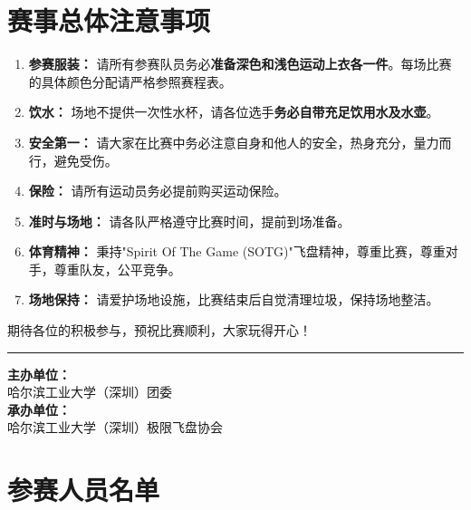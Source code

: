 \documentclass{ctexart}
\begin{document}
\section{赛事总体注意事项}
\begin{enumerate}[label=\arabic*., itemsep=0.5em]
    \item \textbf{参赛服装：} 请所有参赛队员务必\textbf{准备深色和浅色运动上衣各一件}。每场比赛的具体颜色分配请严格参照赛程表。
    \item \textbf{饮水：} 场地不提供一次性水杯，请各位选手\textbf{务必自带充足饮用水及水壶}。
    \item \textbf{安全第一：} 请大家在比赛中务必注意自身和他人的安全，热身充分，量力而行，避免受伤。
    \item \textbf{保险：} 请所有运动员务必提前购买运动保险。
    \item \textbf{准时与场地：} 请各队严格遵守比赛时间，提前到场准备。
    \item \textbf{体育精神：} 秉持"Spirit Of The Game (SOTG)"飞盘精神，尊重比赛，尊重对手，尊重队友，公平竞争。
    \item \textbf{场地保持：} 请爱护场地设施，比赛结束后自觉清理垃圾，保持场地整洁。
\end{enumerate}

\vspace{1.5em}
\begin{center}
期待各位的积极参与，预祝比赛顺利，大家玩得开心！
\end{center}

\noindent\rule{\linewidth}{0.4pt}
\vspace{1em}

\begin{flushleft}
\textbf{主办单位：} \\
哈尔滨工业大学（深圳）团委 \\[1em]

\textbf{承办单位：} \\
哈尔滨工业大学（深圳）极限飞盘协会
\end{flushleft}

\appendix
\section{参赛人员名单}
\end{document}
